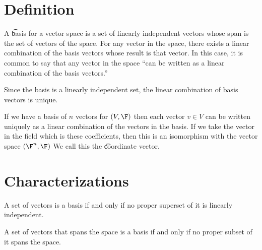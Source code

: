 

\section*{Definition}

A \t{basis for} a vector space is a set of linearly independent vectors whose span is the set of vectors of the space.
For any vector in the space, there exists a linear combination of the basis vectors whose result is that vector.
In this case, it is common to say that any vector in the space ``can be written as a linear combination of the basis vectors.''

Since the basis is a linearly independent set, the linear combination of basis vectors is unique.

If we have a basis of $n$ vectors for $(V, \F )$ then each vector $v \in V$ can be written uniquely as a linear combination of the vectors in the basis.
If we take the vector in the field which is these coefficients, then this is an isomorphism with the vector space $(\F ^n, \F )$
We call this the \t{coordinate vector}.

\section*{Characterizations}

\begin{proposition}
A set of vectors is a basis if and only if no proper superset of it is linearly independent.
\end{proposition}

\begin{proposition}
A set of vectors that spans the space is a basis if and only if no proper subset of it spans the space.
\end{proposition}

\blankpage